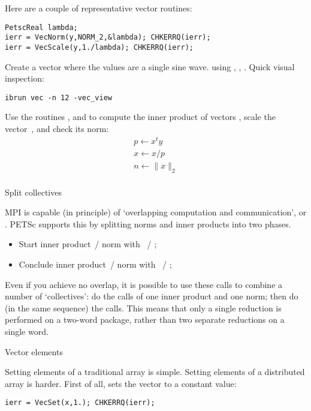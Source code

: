 Here are a couple of representative vector routines:
\begin{lstlisting}
PetscReal lambda;
ierr = VecNorm(y,NORM_2,&lambda); CHKERRQ(ierr);
ierr = VecScale(y,1./lambda); CHKERRQ(ierr);  
\end{lstlisting}

\begin{exercise}
  Create a vector where the values are a single sine wave.
  using , ,
  .
  Quick visual inspection:
\begin{verbatim}
ibrun vec -n 12 -vec_view
\end{verbatim}
\end{exercise}

\begin{exercise}
Use the routines , 
and  to compute the inner product of vectors
, scale the vector~, and check its norm:
\[
\begin{array}{l}
p \leftarrow x^ty\\
x \leftarrow x/p\\
n \leftarrow \|x\|_2\\
\end{array}
\]
\end{exercise}

 {Split collectives}

MPI is capable (in principle) of `overlapping computation and communication',
or . PETSc supports this
by splitting norms and inner products into two phases.
\begin{itemize}
\item Start inner product~/ norm with ~/
  ;
\item Conclude inner product~/ norm with ~/
  ;
\end{itemize}
Even if you achieve no overlap, it is possible to use these calls to
combine a number of `collectives': do the  calls of one inner
product and one norm; then do (in the same sequence) the  calls.
This means that only a single reduction is performed on a two-word
package, rather than two separate reductions on a single word.

 {Vector elements}

Setting elements of a traditional array is simple. Setting elements of
a distributed array is harder.
First of all,  sets the vector to a constant value:
\begin{lstlisting}
ierr = VecSet(x,1.); CHKERRQ(ierr);  
\end{lstlisting}

